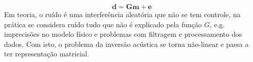 \begin{equation}
\label{eq:sismDiscreta2}
\mathbf{d = Gm + e}
\end{equation}
Em teoria, o ruído é uma interferência aleatória que não se tem
controle, na prática se considera ruído tudo que não é explicado pela função
$G$, e.g. imprecisões no modelo físico e problemas com filtragem e processamento
dos dados. Com isto, o problema da inversão acústica se torna não-linear e passa
a ter representação matricial.

% 
% 
% 
% 
% 
% 
% 
